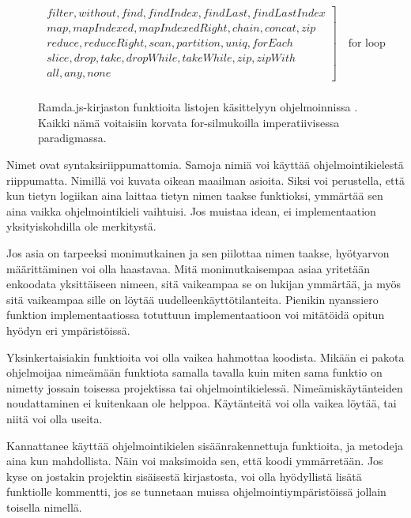 \begin{figure}[ht]
    \centering
    \[
        \begin{array}{rl}
            \left.
            \begin{array}{l}
                filter, without, find, findIndex, findLast, findLastIndex \\
                map, mapIndexed, mapIndexedRight, chain, concat, zip      \\
                reduce, reduceRight, scan, partition, uniq, forEach       \\
                slice, drop, take, dropWhile, takeWhile, zip, zipWith     \\
                all, any, none
            \end{array}
            \right] \quad \text{for loop}
            \\
        \end{array}
    \]
    \caption{Ramda.js-kirjaston funktioita listojen käsittelyyn ohjelmoinnissa \cite{ramda:docs}. Kaikki nämä voitaisiin korvata for-silmukoilla imperatiivisessa paradigmassa.}
    \label{fig:ramdacmds}
\end{figure}

Nimet ovat syntaksiriippumattomia. Samoja nimiä voi käyttää ohjelmointikielestä riippumatta. Nimillä voi kuvata oikean maailman asioita. Siksi voi perustella, että kun tietyn logiikan aina laittaa tietyn nimen taakse funktioksi, ymmärtää sen aina vaikka ohjelmointikieli vaihtuisi. Jos muistaa idean, ei implementaation yksityiskohdilla ole merkitystä.

Jos asia on tarpeeksi monimutkainen ja sen piilottaa nimen taakse, hyötyarvon määrittäminen voi olla haastavaa. Mitä monimutkaisempaa asiaa yritetään enkoodata yksittäiseen nimeen, sitä vaikeampaa se on lukijan ymmärtää, ja myös sitä vaikeampaa sille on löytää uudelleenkäyttötilanteita. Pienikin nyanssiero funktion implementaatiossa totuttuun implementaatioon voi mitätöidä opitun hyödyn eri ympäristöissä.

Yksinkertaisiakin funktioita voi olla vaikea hahmottaa koodista. Mikään ei pakota ohjelmoijaa nimeämään funktiota samalla tavalla kuin miten sama funktio on nimetty jossain toisessa projektissa tai ohjelmointikielessä. Nimeämiskäytänteiden noudattaminen ei kuitenkaan ole helppoa. Käytänteitä voi olla vaikea löytää, tai niitä voi olla useita.

Kannattanee käyttää ohjelmointikielen sisäänrakennettuja funktioita, ja metodeja aina kun mahdollista. Näin voi maksimoida sen, että koodi ymmärretään. Jos kyse on jostakin projektin sisäisestä kirjastosta, voi olla hyödyllistä lisätä funktiolle kommentti, jos se tunnetaan muissa ohjelmointiympäristöissä jollain toisella nimellä.

